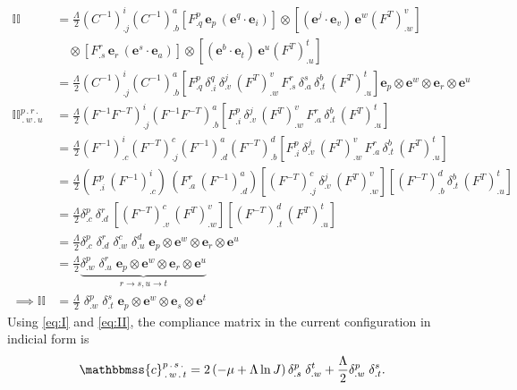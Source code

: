 \begin{equation} \label{eq:II}
    \begin{split}
        \mathbb{II} &= \frac{\Lambda}{2}\left(C^{-1}\right)^i_{.j} \left(C^{-1}\right)^a_{.b} \left[F^p_{.q}\, \boldsymbol{e}_p \,(\boldsymbol{e}^q \cdot \boldsymbol{e}_i)\right] \otimes \left[(\boldsymbol{e}^j \cdot \boldsymbol{e}_v) \,\boldsymbol{e}^w \left(F^T\right)^v_{.w}\right] \\
        &\quad \otimes\left[F^r_{.s}\, \boldsymbol{e}_r \,(\boldsymbol{e}^s \cdot \boldsymbol{e}_a)\right] \otimes \left[(\boldsymbol{e}^b \cdot \boldsymbol{e}_t)\, \boldsymbol{e}^u \left(F^T\right)^t_{.u} \right]\\
    &= \frac{\Lambda}{2} \left(C^{-1}\right)^i_{.j} \left(C^{-1}\right)^a_{.b} \left[F^p_{.q} \,\delta^q_{.i} \,\delta^j_{.v} \,(F^T)^v_{.w} \,F^r_{.s} \,\delta^s_{.a} \,\delta^b_{.t}\, (F^T)^t_{.u} \right] \boldsymbol{e}_p \otimes \boldsymbol{e}^w \otimes \boldsymbol{e}_r \otimes \boldsymbol{e}^u\\
    \mathbb{II}^{p\,.\,r\,.}_{\,.\,w\,.\,u} &= \frac{\Lambda}{2} \left(F^{-1}F^{-T}\right)^i_{.j} \left(F^{-1}F^{-T}\right)^a_{.b} \left[F^p_{.i} \,\delta^j_{.v}\, (F^T)^v_{.w} \,F^r_{.a} \,\delta^b_{.t} \,(F^T)^t_{.u} \right]\\
    &= \frac{\Lambda}{2} \left(F^{-1}\right)^i_{.c} \left(F^{-T}\right)^c_{.j} \left(F^{-1}\right)^a_{.d} \left(F^{-T}\right)^d_{.b} \left[F^p_{.i}\, \delta^j_{.v}\, (F^T)^v_{.w} \,F^r_{.a} \,\delta^b_{.t} \,(F^T)^t_{.u} \right]\\
    &= \frac{\Lambda}{2}(F^p_{.i} \, (F^{-1})^i_{.c})\,(F^r_{.a}\,(F^{-1})^a_{.d})\left[\left(F^{-T}\right)^c_{.j} \,\delta^j_{.v} \,(F^T)^v_{.w}\right] \left[\left(F^{-T}\right)^d_{.b} \,\delta^b_{.t} \,(F^T)^t_{.u}\right]\\
    &= \frac{\Lambda}{2} \delta^p_{.c} \: \delta^r_{.d} \: \left[(F^{-T})^c_{.v}\, (F^T)^v_{.w}\right] \left[(F^{-T})^d_{.t}\, (F^T)^t_{.u}\right]\\
    &= \frac{\Lambda}{2} \delta^p_{.c} \; \delta^r_{.d} \; \delta^c_{.w}\;  \delta^d_{.u} \; \boldsymbol{e}_p \otimes \boldsymbol{e}^w \otimes \boldsymbol{e}_r \otimes \boldsymbol{e}^u\\
    &= \frac{\Lambda}{2} \underbrace{\delta^p_{.w} \; \delta^r_{.u} \; \boldsymbol{e}_p \otimes \boldsymbol{e}^w \otimes \boldsymbol{e}_r \otimes \boldsymbol{e}^u}_{r \rightarrow s, u \rightarrow t}\\
\implies \mathbb{II} &= \frac{\Lambda}{2} \; \delta^p_{.w} \; \delta^s_{.t} \; \boldsymbol{e}_p \otimes \boldsymbol{e}^w \otimes \boldsymbol{e}_s \otimes \boldsymbol{e}^t
\end{split}
\end{equation}
\normalsize Using \eqref{eq:I} and \eqref{eq:II}, the compliance matrix in the current configuration in indicial form is
\begin{equation}
    \mathbbmss{c}^{p\,.\,s\,.}_{\,.\,w\,.\,t} = 2\left(-\mu + \Lambda\ln{J}\right) \delta^p_{.s} \;\delta^t_{.w} + \frac{\Lambda}{2} \delta^p_{.w} \; \delta^s_{.t}.
\end{equation}
